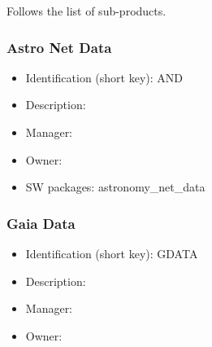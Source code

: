 Follows the list of sub-products.\subsubsection{Astro Net Data}\label{sect:AND}
\begin{itemize}
\item Identification (short key): AND
\item Description: 
\item Manager: 
\item Owner: 
\item SW packages: astronomy\_net\_data
\end{itemize}

\subsubsection{Gaia Data}\label{sect:GDATA}
\begin{itemize}
\item Identification (short key): GDATA
\item Description: 
\item Manager: 
\item Owner: 
\end{itemize}


